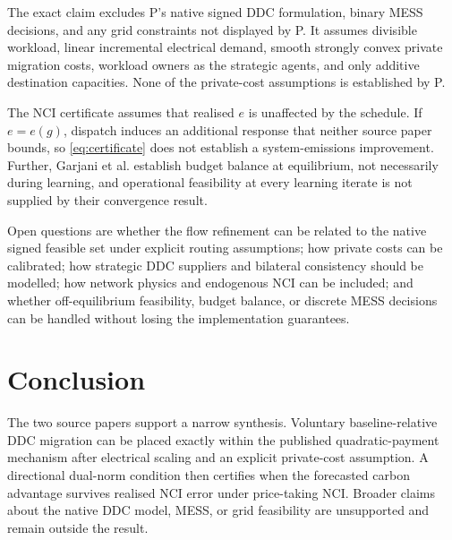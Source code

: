 \documentclass{article}
\begin{document}
The exact claim excludes P's native signed DDC formulation, binary MESS decisions, and any grid constraints not displayed by P. It assumes divisible workload, linear incremental electrical demand, smooth strongly convex private migration costs, workload owners as the strategic agents, and only additive destination capacities. None of the private-cost assumptions is established by P.

The NCI certificate assumes that realised $e$ is unaffected by the schedule. If $e=e(g)$, dispatch induces an additional response that neither source paper bounds, so \eqref{eq:certificate} does not establish a system-emissions improvement. Further, Garjani et al. establish budget balance at equilibrium, not necessarily during learning, and operational feasibility at every learning iterate is not supplied by their convergence result.

Open questions are whether the flow refinement can be related to the native signed feasible set under explicit routing assumptions; how private costs can be calibrated; how strategic DDC suppliers and bilateral consistency should be modelled; how network physics and endogenous NCI can be included; and whether off-equilibrium feasibility, budget balance, or discrete MESS decisions can be handled without losing the implementation guarantees.

\section{Conclusion}

The two source papers support a narrow synthesis. Voluntary baseline-relative DDC migration can be placed exactly within the published quadratic-payment mechanism after electrical scaling and an explicit private-cost assumption. A directional dual-norm condition then certifies when the forecasted carbon advantage survives realised NCI error under price-taking NCI. Broader claims about the native DDC model, MESS, or grid feasibility are unsupported and remain outside the result.



\end{document}
